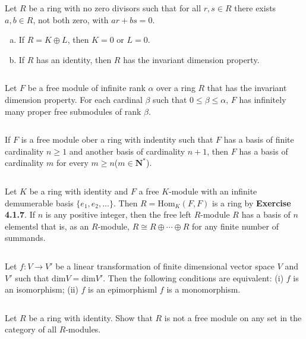$$ $$

\begin{ex}
    Let $R$ be a ring with no zero divisors such that for all $r,s\in R$ there exists $a,b\in R$, not both zero, with $ar+bs=0$.
    \begin{enumerate}[(a)]
        \item If $R=K\oplus L$, then $K=0$ or $L=0$.
        \item If $R$ has an identity, then $R$ has the invariant dimension property.
    \end{enumerate}
\end{ex}

$$ $$

\begin{ex}
    Let $F$ be a free module of infinite rank $\alpha$ over a ring $R$ that has the invariant dimension property. For each cardinal $\beta$ such that $0\leq \beta\leq \alpha$, $F$ has infinitely many proper free submodules of rank $\beta$.
\end{ex}

$$ $$

\begin{ex}
    If $F$ is a free module ober a ring with indentity such that $F$ has a basis of finite cardinality $n\geq 1$ and another basis of cardinality $n+1$, then $F$ has a basis of cardinality $m$ for every $m\geq n$($m\in \mathbf{N}^{*}$).
\end{ex}

$$ $$

\begin{ex}
    Let $K$ be a ring with identity and $F$ a free $K$-module with an infinite demumerable basis $\{e_{1},e_{2},\dots\}$. Then $R=\mathrm{Hom}_{K}(F,F)$ is a ring by \textbf{Exercise 4.1.7}. If $n$ is any positive integer, then the free left $R$-module $R$ has a basis of $n$ elementsl that is,  as an $R$-module, $R\cong R\oplus\cdots\oplus R$ for any finite number of summands.
\end{ex}

$$ $$

\begin{ex}
    Let $f:V\to V'$ be a linear transformation of finite dimensional vector space $V$ and $V'$ such that $\mathrm{dim}V=\mathrm{dim}V'$. Then the following conditions are equivalent: (i) $f$ is an isomorphism; (ii) $f$ is an epimorphisml $f$ is a monomorphism.
\end{ex}

$$ $$

\begin{ex}
    Let $R$ be a ring with identity. Show that $R$ is not a free module on any set in the category of all $R$-modules.
\end{ex}
